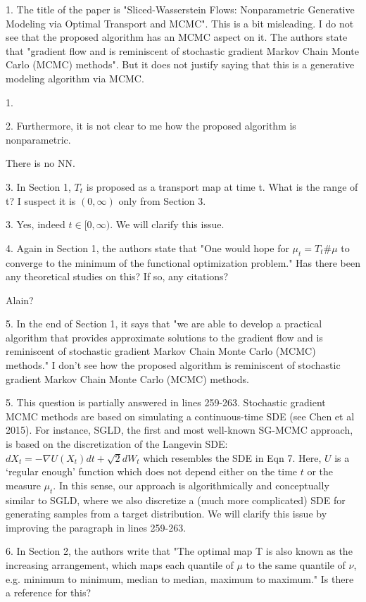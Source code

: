 \documentclass{article}
\newcommand{\rev}[1]{{\color{red} #1}}
\newcommand{\umut}[1]{{\color{blue} #1}}
\begin{document}
\rev{1. The title of the paper is "Sliced-Wasserstein Flows: Nonparametric Generative Modeling via Optimal Transport and MCMC". This is a bit misleading. I do not see that the proposed algorithm has an MCMC aspect on it. The authors state that "gradient flow and is reminiscent of stochastic gradient Markov Chain Monte Carlo (MCMC) methods". But it does not justify saying that this is a generative modeling algorithm via MCMC.} 

1.  

\rev{2. Furthermore, it is not clear to me how the proposed algorithm is nonparametric.} 

\umut{There is no NN.}

\rev{3. In Section 1, $T_t$ is proposed as a transport map at time t. What is the range of t? I suspect it is $(0, \infty)$ only from Section 3.} 

3. Yes, indeed $t \in [0, \infty)$. We will clarify this issue.

\rev{4. Again in Section 1, the authors state that "One would hope for $\mu_t = T_t \#\mu$ to converge to the minimum of the functional optimization problem." Has there been any theoretical studies on this? If so, any citations?} 

\umut{Alain?}

\rev{5. In the end of Section 1, it says that "we are able to develop a practical algorithm that provides approximate solutions to the gradient flow and is reminiscent of stochastic gradient Markov Chain Monte Carlo (MCMC) methods." I don't see how the proposed algorithm is reminiscent of stochastic gradient Markov Chain Monte Carlo (MCMC) methods.} 

5. This question is partially answered in lines 259-263. Stochastic gradient MCMC methods are based on simulating a continuous-time SDE (see Chen et al 2015). For instance, SGLD, the first and most well-known SG-MCMC approach, is based on the discretization of the Langevin SDE: $d X_t = - \nabla U(X_t) dt + \sqrt{2} dW_t$ which resembles the SDE in Eqn 7. Here, $U$ is a `regular enough' function which does not depend either on the time $t$ or the measure $\mu_t$. In this sense, our approach is algorithmically and conceptually similar to SGLD, where we also discretize a (much more complicated) SDE for generating samples from a target distribution. We will clarify this issue by improving the paragraph in lines 259-263.

\rev{6. In Section 2, the authors write that "The optimal map T is also known as the increasing arrangement, which maps each quantile of $\mu$ to the same quantile of $\nu$, e.g. minimum to minimum, median to median, maximum to maximum." Is there a reference for this?} 
\end{document}
